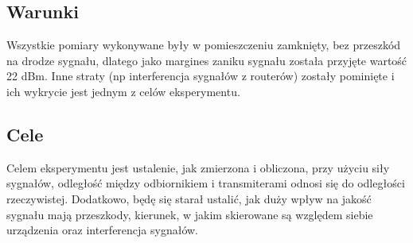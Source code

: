 \documentclass{article}
\begin{document}
		\subsection{Warunki}
			Wszystkie pomiary wykonywane były w pomieszczeniu zamknięty, bez przeszkód na drodze sygnału, dlatego jako margines zaniku sygnału została przyjęte wartość 22 dBm. Inne straty (np interferencja sygnałów z routerów) zostały pominięte i ich wykrycie jest jednym z celów eksperymentu.
		\subsection{Cele}
			Celem eksperymentu jest ustalenie, jak zmierzona i obliczona, przy użyciu siły sygnałów, odległość między odbiornikiem i transmiterami odnosi się do odległości rzeczywistej. Dodatkowo, będę się starał ustalić, jak duży wpływ na jakość sygnału mają przeszkody, kierunek, w jakim skierowane są względem siebie urządzenia oraz interferencja sygnałów.
\end{document}
